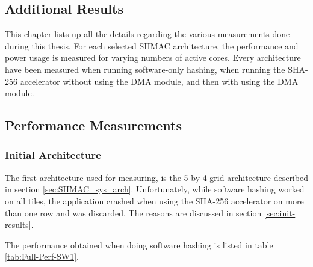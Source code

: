 \begin{appendix}
\chapter{Additional Results}
\label{app:performance}

This chapter lists up all the details regarding the various measurements done during this thesis.
For each selected SHMAC architecture, the performance and power usage is measured for varying numbers
of active cores. Every architecture have been measured when running software-only hashing, when running
the SHA-256 accelerator without using the DMA module, and then with using the DMA module. 

\section{Performance Measurements}

\subsection{Initial Architecture}

The first architecture used for measuring, is the 5 by 4 grid architecture described in section \ref{sec:SHMAC_sys_arch}.
Unfortunately, while software hashing worked on all tiles, the application crashed when using the SHA-256 accelerator on more than one row
and was discarded. The reasons are discussed in section \ref{sec:init-results}.

The performance obtained when doing software hashing is listed in table \ref{tab:Full-Perf-SW1}. 


\end{appendix}
